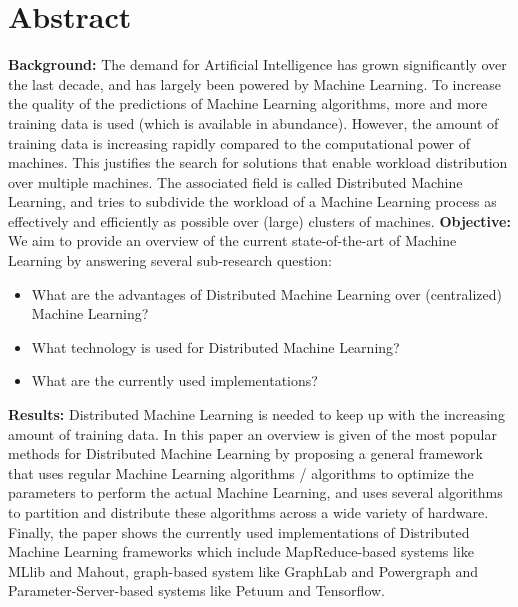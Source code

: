 \section{Abstract}
\textbf{Background:} The demand for Artificial Intelligence has grown significantly over the last decade, and has largely been powered by Machine Learning. To increase the quality of the predictions of Machine Learning algorithms, more and more training data is used (which is available in abundance). However, the amount of training data is increasing rapidly compared to the computational power of machines. This justifies the search for solutions that enable workload distribution over multiple machines. The associated field is called Distributed Machine Learning, and tries to subdivide the workload of a Machine Learning process as effectively and efficiently as possible over (large) clusters of machines.
\textbf{Objective:} We aim to provide an overview of the current state-of-the-art of Machine Learning by answering several sub-research question:
\begin{itemize}
	\item What are the advantages of Distributed Machine Learning over (centralized) Machine Learning?
	\item What technology is used for Distributed Machine Learning?
	\item What are the currently used implementations?
\end{itemize}
\textbf{Results:} Distributed Machine Learning is needed to keep up with the increasing amount of training data. In this paper an overview is given of the most popular methods for Distributed Machine Learning by proposing a general framework that uses regular Machine Learning algorithms / algorithms to optimize the parameters to perform the actual Machine Learning, and uses several algorithms to partition and distribute these algorithms across a wide variety of hardware. Finally, the paper shows the currently used implementations of Distributed Machine Learning frameworks which include MapReduce-based systems like MLlib and Mahout, graph-based system like GraphLab and Powergraph and Parameter-Server-based systems like Petuum and Tensorflow.